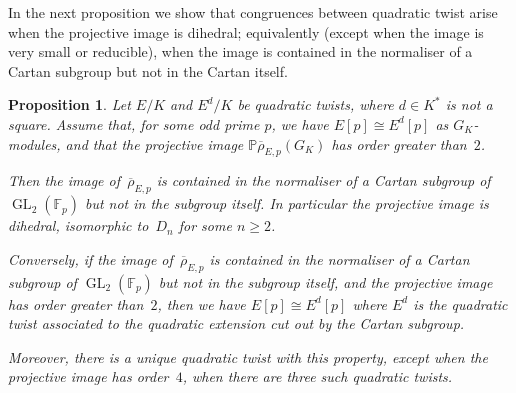\documentclass[12pt, reqno]{amsart}
\newcommand{\F}{\mathbb{F}}
\newcommand{\PP}{\mathbb{P}}
\newcommand{\rhobar}{{\overline{\rho}}}
\newcommand{\GL}{\operatorname{GL}}
\numberwithin{equation}{section}
\newtheorem{proposition}[theorem]{Proposition}
\theoremstyle{definition}
\theoremstyle{remark}
\begin{document}
In the next proposition we show that congruences between quadratic
twist arise when the projective image is dihedral; equivalently
(except when the image is very small or reducible), when the image is
contained in the normaliser of a Cartan subgroup but not in the Cartan
itself.

\begin{proposition}\label{P:twist}
Let $E/K$ and $E^d/K$ be quadratic twists, where $d\in K^*$ is not a
square. Assume that, for some odd prime $p$, we have $E[p]\cong
E^d[p]$ as $G_K$-modules, and that the projective image
$\PP\rhobar_{E,p}(G_K)$ has order greater than~$2$.

Then the image of~$\rhobar_{E,p}$ is contained in the normaliser of a
Cartan subgroup of $\GL_2(\F_p)$ but not in the subgroup itself.  In
particular the projective image is dihedral, isomorphic to~$D_n$ for
some $n\ge2$.

Conversely, if the image of~$\rhobar_{E,p}$ is contained in the
normaliser of a Cartan subgroup of $\GL_2(\F_p)$ but not in the
subgroup itself, and the projective image has order greater than~$2$,
then we have $E[p]\cong E^d[p]$ where $E^d$ is the quadratic twist
associated to the quadratic extension cut out by the Cartan subgroup.

Moreover, there is a unique quadratic twist with this property, except
when the projective image has order~$4$, when there are three such
quadratic twists.
\end{proposition}
\end{document}
